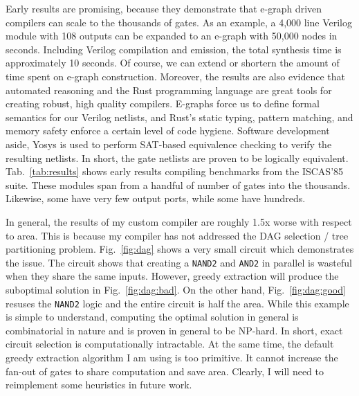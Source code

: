 \documentclass[10pt,letterpaper]{article}
\begin{document}
Early results are promising, because they demonstrate that e-graph driven
compilers can scale to the thousands of gates. As an example, a 4,000 line
Verilog module with 108 outputs can be expanded to an e-graph with 50,000 nodes
in seconds. Including Verilog compilation and emission, the total synthesis
time is approximately 10 seconds. Of course, we can extend or shortern the
amount of time spent on e-graph construction. Moreover, the results are also
evidence that automated reasoning and the Rust programming language are great
tools for creating robust, high quality compilers. E-graphs force us to define
formal semantics for our Verilog netlists, and Rust's static typing, pattern
matching, and memory safety enforce a certain level of code hygiene. Software
development aside, Yosys is used to perform SAT-based equivalence checking to
verify the resulting netlists. In short, the gate netlists are proven to be
logically equivalent. Tab.~\ref{tab:results} shows early results compiling
benchmarks from the ISCAS'85 suite. These modules span from a handful of number
of gates into the thousands. Likewise, some have very few output ports, while
some have hundreds.

In general, the results of my custom compiler are roughly 1.5x worse with
respect to area. This is because my compiler has not addressed the DAG
selection / tree partitioning problem. Fig.~\ref{fig:dag} shows a very small
circuit which demonstrates the issue. The circuit shows that creating a
\texttt{NAND2} and \texttt{AND2} in parallel is wasteful when they share the
same inputs. However, greedy extraction will produce the suboptimal solution in
Fig.~\ref{fig:dag:bad}. On the other hand, Fig.~\ref{fig:dag:good} resuses the
\texttt{NAND2} logic and the entire circuit is half the area. While this
example is simple to understand, computing the optimal solution in general is
combinatorial in nature and is proven in general to be NP-hard. In short, exact
circuit selection is computationally intractable. At the same time, the default
greedy extraction algorithm I am using is too primitive. It cannot increase the
fan-out of gates to share computation and save area. Clearly, I will need to
reimplement some heuristics in future work.
\end{document}
